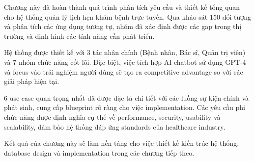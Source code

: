 \documentclass[../DoAn.tex]{subfiles}
\begin{document}
Chương này đã hoàn thành quá trình phân tích yêu cầu và thiết kế tổng quan cho hệ thống quản lý lịch hẹn khám bệnh trực tuyến. Qua khảo sát 150 đối tượng và phân tích các ứng dụng tương tự, nhóm đã xác định được các gap trong thị trường và định hình các tính năng cần phát triển.

Hệ thống được thiết kế với 3 tác nhân chính (Bệnh nhân, Bác sĩ, Quản trị viên) và 7 nhóm chức năng cốt lõi. Đặc biệt, việc tích hợp AI chatbot sử dụng GPT-4 và focus vào trải nghiệm người dùng sẽ tạo ra competitive advantage so với các giải pháp hiện tại.

6 use case quan trọng nhất đã được đặc tả chi tiết với các luồng sự kiện chính và phát sinh, cung cấp blueprint rõ ràng cho việc implementation. Các yêu cầu phi chức năng được định nghĩa cụ thể về performance, security, usability và scalability, đảm bảo hệ thống đáp ứng standards của healthcare industry.

Kết quả của chương này sẽ làm nền tảng cho việc thiết kế kiến trúc hệ thống, database design và implementation trong các chương tiếp theo.
\end{document}
